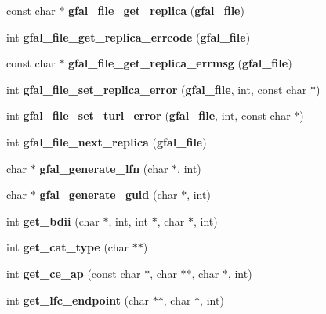 \begin{DoxyCompactItemize}
\item 
const char $\ast$ {\bfseries gfal\_\-file\_\-get\_\-replica} ({\bf gfal\_\-file})\label{group__internal__group_ga6f9bf1865764e0390d13d8ac9f831c89}

\item 
int {\bfseries gfal\_\-file\_\-get\_\-replica\_\-errcode} ({\bf gfal\_\-file})\label{group__internal__group_ga6ac04712a6e58e1bf0b2349b8a9d1827}

\item 
const char $\ast$ {\bfseries gfal\_\-file\_\-get\_\-replica\_\-errmsg} ({\bf gfal\_\-file})\label{group__internal__group_ga0737d76022b4c52c4162805486399182}

\item 
int {\bfseries gfal\_\-file\_\-set\_\-replica\_\-error} ({\bf gfal\_\-file}, int, const char $\ast$)\label{group__internal__group_gaa677cbe55fe95e59480dcb48f908ede1}

\item 
int {\bfseries gfal\_\-file\_\-set\_\-turl\_\-error} ({\bf gfal\_\-file}, int, const char $\ast$)\label{group__internal__group_gaf54482869fd29812ea48a0ba27d03965}

\item 
int {\bfseries gfal\_\-file\_\-next\_\-replica} ({\bf gfal\_\-file})\label{group__internal__group_ga1b346ec92835cb084638c89a74afd496}

\item 
char $\ast$ {\bfseries gfal\_\-generate\_\-lfn} (char $\ast$, int)\label{group__internal__group_ga05b5a81f883051a978753d983f378f11}

\item 
char $\ast$ {\bfseries gfal\_\-generate\_\-guid} (char $\ast$, int)\label{group__internal__group_ga284bc8302b6c18ba06c0b9d2869886dc}

\item 
int {\bfseries get\_\-bdii} (char $\ast$, int, int $\ast$, char $\ast$, int)\label{group__internal__group_ga7eacd85cc69aa14f7cde9d825ab568c9}

\item 
int {\bfseries get\_\-cat\_\-type} (char $\ast$$\ast$)\label{group__internal__group_gae97a4581887e037f0e9f7ce817a21648}

\item 
int {\bfseries get\_\-ce\_\-ap} (const char $\ast$, char $\ast$$\ast$, char $\ast$, int)\label{group__internal__group_ga4308e8212eb1431c85530d079dccf175}

\item 
int {\bfseries get\_\-lfc\_\-endpoint} (char $\ast$$\ast$, char $\ast$, int)\label{group__internal__group_gacea9636c05436e91be5a54bba5e0af30}


\end{DoxyCompactItemize}
